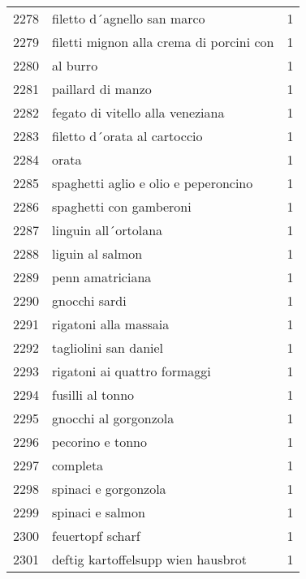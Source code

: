 \begin{tabular}{llr}
2278 &                        filetto d´agnello san marco &      1 \\
2279 &           filetti mignon alla crema di porcini con &      1 \\
2280 &                                           al burro &      1 \\
2281 &                                  paillard di manzo &      1 \\
2282 &                   fegato di vitello alla veneziana &      1 \\
2283 &                       filetto d´orata al cartoccio &      1 \\
2284 &                                              orata &      1 \\
2285 &               spaghetti aglio e olio e peperoncino &      1 \\
2286 &                            spaghetti con gamberoni &      1 \\
2287 &                               linguin all´ortolana &      1 \\
2288 &                                   liguin al salmon &      1 \\
2289 &                                   penn amatriciana &      1 \\
2290 &                                      gnocchi sardi &      1 \\
2291 &                              rigatoni alla massaia &      1 \\
2292 &                              tagliolini san daniel &      1 \\
2293 &                       rigatoni ai quattro formaggi &      1 \\
2294 &                                   fusilli al tonno &      1 \\
2295 &                              gnocchi al gorgonzola &      1 \\
2296 &                                   pecorino e tonno &      1 \\
2297 &                                           completa &      1 \\
2298 &                               spinaci e gorgonzola &      1 \\
2299 &                                   spinaci e salmon &      1 \\
2300 &                                   feuertopf scharf &      1 \\
2301 &                 deftig kartoffelsupp wien hausbrot &      1 \\

\end{tabular}
